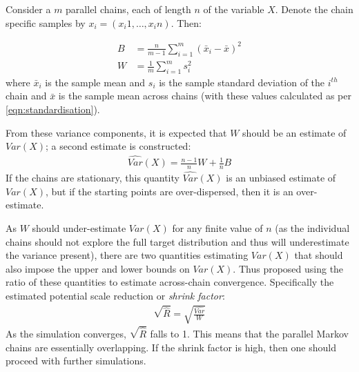 \documentclass[12pt]{article} %
\begin{document}
Consider a $m$ parallel chains, each of length $n$ of the variable $X$. Denote the chain specific samples by $x_i = (x_i1,\ldots,x_in)$. Then:

\begin{align}
B &= \frac{n}{m-1}\sum_{i=1}^m (\bar{x}_i - \bar{x})^2 \\
W &= \frac{1}{m}\sum_{i=1}^m s_i^2
\end{align}
where $\bar{x}_i$ is the sample mean and $s_i$ is the sample standard deviation of the $i^{th}$ chain and $\bar{x}$ is the sample mean across chains (with these values calculated as per \eqref{eqn:standardisation}). 

From these variance components, it is expected that $W$ should be an estimate of $Var(X)$; a second estimate is constructed:
\begin{align}
\hat{Var}(X) = \frac{n-1}{n}W + \frac{1}{n}B
\end{align}
If the chains are stationary, this quantity $\hat{Var}(X)$ is an unbiased estimate of $Var(X)$, but if the starting points are over-dispersed, then it is an over-estimate.

As $W$ should under-estimate $Var(X)$ for any finite value of $n$ (as the individual chains should not explore the full target distribution and thus will underestimate the variance present), there are two quantities estimating $Var(X)$ that should also impose the upper and lower bounds on $Var(X)$. Thus \citet{GelmanInferenceIterativeSimulation1992} proposed using the ratio of these quantities to estimate across-chain convergence. Specifically the estimated potential scale reduction or \emph{shrink factor}:
\begin{align}
\sqrt{\hat{R}} = \sqrt{\frac{\hat{Var}}{W}}
\end{align}
As the simulation converges, $\sqrt{\hat{R}}$ falls to 1. This means that the parallel Markov chains  are  essentially  overlapping.   If  the  shrink  factor  is  high,  then  one  should  proceed  with further simulations.



%
%
%
\end{document}
